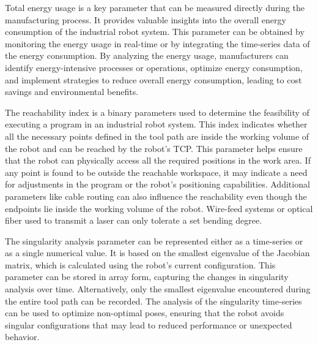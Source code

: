 Total energy usage is a key parameter that can be measured directly during the manufacturing process. It provides valuable insights into the overall energy consumption of the industrial robot system. This parameter can be obtained by monitoring the energy usage in real-time or by integrating the time-series data of the energy consumption. By analyzing the energy usage, manufacturers can identify energy-intensive processes or operations, optimize energy consumption, and implement strategies to reduce overall energy consumption, leading to cost savings and environmental benefits.



The reachability index is a binary parameters used to determine the feasibility of executing a program in an industrial robot system. This index indicates whether all the necessary points defined in the tool path are inside the working volume of the robot and can be reached by the robot's TCP. This parameter helps ensure that the robot can physically access all the required positions in the work area. If any point is found to be outside the reachable workspace, it may indicate a need for adjustments in the program or the robot's positioning capabilities. Additional parameters like cable routing can also influence the reachability even though the endpoints lie inside the working volume of the robot. Wire-feed systems or optical fiber used to transmit a laser can only tolerate a set bending degree.  


The singularity analysis parameter can be represented either as a time-series or as a single numerical value. It is based on the smallest eigenvalue of the Jacobian matrix, which is calculated using the robot's current configuration. This parameter can be stored in array form, capturing the changes in singularity analysis over time. Alternatively, only the smallest eigenvalue encountered during the entire tool path can be recorded. The analysis of the singularity time-series can be used to optimize non-optimal poses, ensuring that the robot avoids singular configurations that may lead to reduced performance or unexpected behavior.


